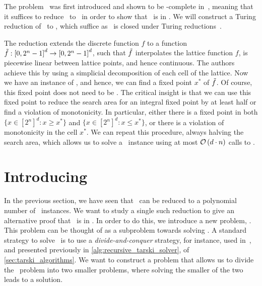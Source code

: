 
The problem \Brouwer\ was first introduced and shown to be \PPAD-complete in~, meaning that it suffices to reduce \Tarski\ to \Brouwer\ in order to show that \Tarski\ is in \PPAD\@. We will construct a Turing reduction of \Tarski\ to \Brouwer, which suffice as \PPAD\ is closed under Turing reductions~.

The reduction extends the discrete function $f$ to a function $\Tilde{f} : {[0, 2^n - 1]}^d \rightarrow {[0, 2^n - 1]}^d$, such that $\Tilde{f}$ interpolates the lattice function $f$, is piecewise linear between lattice points, and hence continuous. The authors achieve this by using a simplicial decomposition of each cell of the lattice. Now we have an instance of \Brouwer, and hence, we can find a fixed point $x^*$ of $\Tilde{f}$. Of course, this fixed point does not need to be .
The critical insight is that we can use this fixed point to reduce the search area for an integral fixed point by at least half or find a violation of monotonicity. In particular, either there is a fixed point in both $\{x \in {[2^n]}^d : x \geq x^*\}$ and $\{x \in {[2^n]}^d : x \leq x^*\}$, or there is a violation of monotonicity in the cell $x^*$.
We can repeat this procedure, always halving the search area, which allows us to solve a \Tarski\ instance using at most $\mathcal{O}\left(d \cdot n\right)$ calls to \Brouwer.

\section{Introducing \Tarskistar}\label{sec:introducing_tarskistar}

In the previous section, we have seen that \Tarski\ can be reduced to a polynomial number of \Brouwer\ instances. We want to study a single such reduction to give an alternative proof that \Tarski\ is in \PPAD\@. In order to do this, we introduce a new problem, \Tarskistar. This problem can be thought of as a subproblem towards solving \Tarski. A standard strategy to solve \Tarski\ is to use a \emph{divide-and-conquer} strategy, for instance, used in~, and presented previously in \cref{alg:recursive_tarski_solver}, of \cref{sec:tarski_algorithms}. We want to construct a problem that allows us to divide the \Tarski\ problem into two smaller problems, where solving the smaller of the two leads to a solution.

